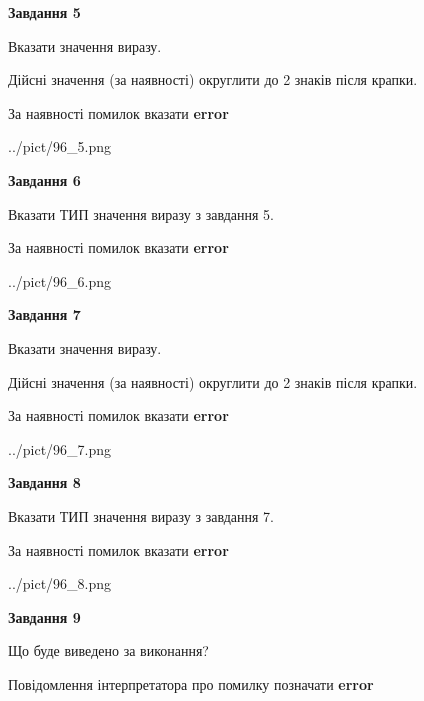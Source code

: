 \documentclass[11pt, ukrainian]{article}
\begin{document}
{\begin {large}
{\begin {center}\textbf{Завдання 5}\end {center}}\par
Вказати значення виразу. \par
Дійсні значення (за наявності) округлити до 2 знаків після крапки. \par
За наявності помилок вказати \textbf{error}

\begin{center}
	{../pict/96_5.png}
\end{center}
\newpage

{\begin {center}\textbf{Завдання 6}\end {center}}\par
Вказати ТИП значення виразу з завдання 5. \par
За наявності помилок вказати \textbf{error}

\begin{center}
	{../pict/96_6.png}
\end{center}
\newpage

{\begin {center}\textbf{Завдання 7}\end {center}}\par
Вказати значення виразу. \par
Дійсні значення (за наявності) округлити до 2 знаків після крапки. \par
За наявності помилок вказати \textbf{error}

\begin{center}
	{../pict/96_7.png}
\end{center}
\newpage

{\begin {center}\textbf{Завдання 8}\end {center}}\par
Вказати ТИП значення виразу з завдання 7. \par
За наявності помилок вказати \textbf{error}

\begin{center}
	{../pict/96_8.png}
\end{center}
\newpage

{\begin {center}\textbf{Завдання 9}\end {center}}\par
Що буде виведено за виконання? \par
Повідомлення інтерпретатора про помилку позначати \textbf{error}


\end{large}}
\end{document}
